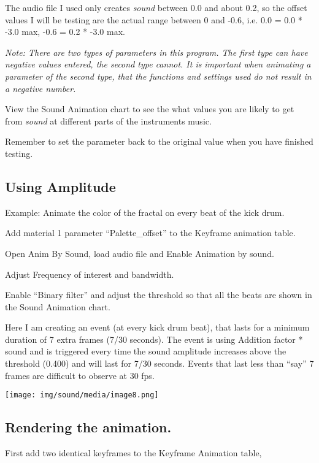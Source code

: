 The audio file I used only creates \emph{sound} between 0.0 and about
0.2, so the offset values I will be testing are the actual range between
0 and -0.6, i.e. 0.0 = 0.0 * -3.0 max, -0.6 = 0.2 * -3.0 max.

\emph{Note: There are two types of parameters in this program. The first
type can have negative values entered, the second type cannot. It is}
\emph{important} \emph{when animating a parameter of the second type,
that the functions and settings used do not result in a negative
number.}

View the Sound Animation chart to see the what values you are likely to
get from \emph{sound} at different parts of the instruments music.

Remember to set the parameter back to the original value when you have
finished testing.

\subsection{Using Amplitude}\label{using-amplitude}

Example: Animate the color of the fractal on every beat of the kick
drum.

Add material 1 parameter ``Palette\_offset'' to the Keyframe animation
table.

Open Anim By Sound, load audio file and Enable Animation by sound.

Adjust Frequency of interest and bandwidth.

Enable ``Binary filter'' and adjust the threshold so that all the beats
are shown in the Sound Animation chart.

Here I am creating an event (at every kick drum beat), that lasts for a
minimum duration of 7 extra frames (7/30 seconds). The event is using
Addition factor * sound and is triggered every time the sound amplitude
increases above the threshold (0.400) and will last for 7/30 seconds.
Events that last less than ``say'' 7 frames are difficult to observe at
30 fps.

\texttt{[image: img/sound/media/image8.png]}

\subsection{Rendering the animation.}\label{rendering-the-animation.}

First add two identical keyframes to the Keyframe Animation table,

